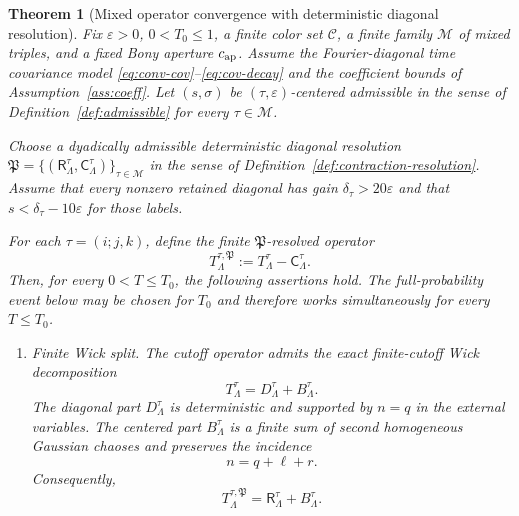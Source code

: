 \documentclass[11pt,reqno]{amsart}
\numberwithin{equation}{section}
\theoremstyle{plain}
\newtheorem{theorem}{Theorem}[section]
\theoremstyle{definition}
\newcommand{\cC}{\mathcal C}
\newcommand{\cM}{\mathcal M}
\newcommand{\eps}{\varepsilon}
\newcommand{\Ret}{\mathsf R}
\newcommand{\Ctr}{\mathsf C}
\begin{document}
\begin{theorem}[Mixed operator convergence with deterministic diagonal resolution]\label{thm:main}
Fix \(\eps>0\), \(0<T_0\le1\), a finite color set \(\cC\), a finite family \(\cM\) of mixed triples, and a fixed Bony aperture \(c_{\rm ap}\).  Assume the Fourier-diagonal time covariance model \eqref{eq:conv-cov}--\eqref{eq:cov-decay} and the coefficient bounds of Assumption~\ref{ass:coeff}.  Let \((s,\sigma)\) be \((\tau,\eps)\)-centered admissible in the sense of Definition~\ref{def:admissible} for every \(\tau\in\cM\).

Choose a dyadically admissible deterministic diagonal resolution
\(\mathfrak P=\{(\Ret^\tau_\Lambda,\Ctr^\tau_\Lambda)\}_{\tau\in\cM}\)
in the sense of Definition~\ref{def:contraction-resolution}.  Assume that
every nonzero retained diagonal has gain \(\delta_\tau>20\eps\) and that
\(s<\delta_\tau-10\eps\) for those labels.

For each \(\tau=(i;j,k)\), define the finite \(\mathfrak P\)-resolved operator
\begin{equation}\label{eq:ren-operator-general}
        T_{\Lambda}^{\tau,\mathfrak P}:=T_{\Lambda}^{\tau}-\Ctr^\tau_\Lambda .
\end{equation}
Then, for every \(0<T\le T_0\), the following assertions hold.
The full-probability event below may be chosen for \(T_0\) and therefore
works simultaneously for every \(T\le T_0\).

\begin{enumerate}[label=(\roman*),leftmargin=2.4em]
\item \textup{Finite Wick split.}  The cutoff operator admits the exact finite-cutoff Wick decomposition
\begin{equation}\label{eq:main-split}
        T_{\Lambda}^{\tau}=D_{\Lambda}^{\tau}+B_{\Lambda}^{\tau}.
\end{equation}
The diagonal part \(D_{\Lambda}^{\tau}\) is deterministic and supported by \(n=q\) in the external variables.  The centered part \(B_{\Lambda}^{\tau}\) is a finite sum of second homogeneous Gaussian chaoses and preserves the incidence
\begin{equation}\label{eq:external-incidence}
        n=q+\ell+r.
\end{equation}
Consequently,
\begin{equation}\label{eq:ren-split}
        T_{\Lambda}^{\tau,\mathfrak P}=\Ret^\tau_\Lambda+B^\tau_\Lambda.
\end{equation}


\end{enumerate}
\end{theorem}
\end{document}
